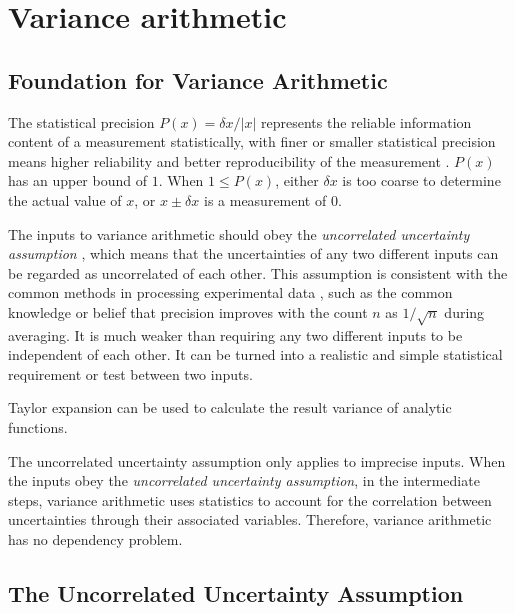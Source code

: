 \documentclass[twoside]{article}
\numberwithin{equation}{section}
\begin{document}
\clearpage
\section{Variance arithmetic}
\label{sec: variance arithmetic}


\subsection{Foundation for Variance Arithmetic}

The statistical precision $P(x) = \delta x/|x|$ represents the reliable information content of a measurement statistically, with finer or smaller statistical precision means higher reliability and better reproducibility of the measurement \cite{Statistical_Methods}\cite{Precisions_Physical_Measurements}. 
$P(x)$ has an upper bound of $1$.
When $1 \leq P(x)$, either $\delta x$ is too coarse to determine the actual value of $x$, or $x \pm \delta x$ is a measurement of $0$.

The inputs to variance arithmetic should obey the \emph{uncorrelated uncertainty assumption} \cite{Prev_Precision_Arithmetic}, which means that the uncertainties of any two different inputs can be regarded as uncorrelated of each other. 
This assumption is consistent with the common methods in processing experimental data \cite{Statistical_Methods}\cite{Precisions_Physical_Measurements}, such as the common knowledge or belief that precision improves with the count $n$ as $1 / \sqrt{n}$ during averaging.
It is much weaker than requiring any two different inputs to be independent of each other.
It can be turned into a realistic and simple statistical requirement or test between two inputs.

Taylor expansion can be used to calculate the result variance of analytic functions.

The uncorrelated uncertainty assumption only applies to imprecise inputs.
When the inputs obey the \emph{uncorrelated uncertainty assumption}, in the intermediate steps, variance arithmetic uses statistics to account for the correlation between uncertainties through their associated variables.
Therefore, variance arithmetic has no dependency problem.


\subsection{The Uncorrelated Uncertainty Assumption \cite{Prev_Precision_Arithmetic}}
\end{document}
